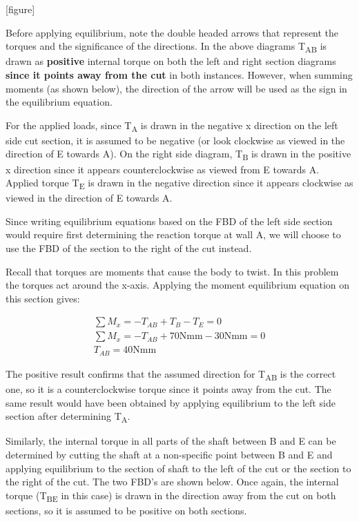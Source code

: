 \documentclass[
  letterpaper,
  DIV=11,
  numbers=noendperiod]{scrreprt}
\begin{document}
\begin{tcolorbox}
\begin{tcolorbox}
{[}figure{]}

Before applying equilibrium, note the double headed arrows that
represent the torques and the significance of the directions. In the
above diagrams T\textsubscript{AB} is drawn as \textbf{positive}
internal torque on both the left and right section diagrams
\textbf{since it points away from the cut} in both instances. However,
when summing moments (as shown below), the direction of the arrow will
be used as the sign in the equilibrium equation.

For the applied loads, since T\textsubscript{A} is drawn in the negative
x direction on the left side cut section, it is assumed to be negative
(or look clockwise as viewed in the direction of E towards A). On the
right side diagram, T\textsubscript{B} is drawn in the positive x
direction since it appears counterclockwise as viewed from E towards A.
Applied torque T\textsubscript{E} is drawn in the negative direction
since it appears clockwise as viewed in the direction of E towards A.

Since writing equilibrium equations based on the FBD of the left side
section would require first determining the reaction torque at wall A,
we will choose to use the FBD of the section to the right of the cut
instead.

Recall that torques are moments that cause the body to twist. In this
problem the torques act around the x-axis. Applying the moment
equilibrium equation on this section gives:

\[
\begin{gathered}
\sum M_x=-T_{A B}+T_B-T_E=0 \\
\sum M_x=-T_{A B}+70 \mathrm{Nmm}-30 \mathrm{Nmm}=0 \\
T_{A B}=40 \mathrm{Nmm}
\end{gathered}
\]

The positive result confirms that the assumed direction for
T\textsubscript{AB} is the correct one, so it is a counterclockwise
torque since it points away from the cut. The same result would have
been obtained by applying equilibrium to the left side section after
determining T\textsubscript{A}.

Similarly, the internal torque in all parts of the shaft between B and E
can be determined by cutting the shaft at a non-specific point between B
and E and applying equilibrium to the section of shaft to the left of
the cut or the section to the right of the cut. The two FBD's are shown
below. Once again, the internal torque (T\textsubscript{BE} in this
case) is drawn in the direction away from the cut on both sections, so
it is assumed to be positive on both sections.


\end{tcolorbox}
\end{tcolorbox}
\end{document}
